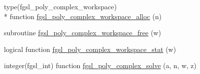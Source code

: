 \begin{DoxyCompactItemize}
\item 
type(fgsl\-\_\-poly\-\_\-complex\-\_\-workspace) \\*
function \hyperlink{poly_8finc_ab324087e2007b6a8888d0436e0ac0322}{fgsl\-\_\-poly\-\_\-complex\-\_\-workspace\-\_\-alloc} (n)
\item 
subroutine \hyperlink{poly_8finc_ae2007cfcdbda42950869ce3f470f3109}{fgsl\-\_\-poly\-\_\-complex\-\_\-workspace\-\_\-free} (w)
\item 
logical function \hyperlink{poly_8finc_a2ad3c57aca45300bbe7a535dbb0863b2}{fgsl\-\_\-poly\-\_\-complex\-\_\-workspace\-\_\-stat} (w)
\item 
integer(fgsl\-\_\-int) function \hyperlink{poly_8finc_a84ce53a3eccf9334e4f4266fbf03ab12}{fgsl\-\_\-poly\-\_\-complex\-\_\-solve} (a, n, w, z)
\end{DoxyCompactItemize}


